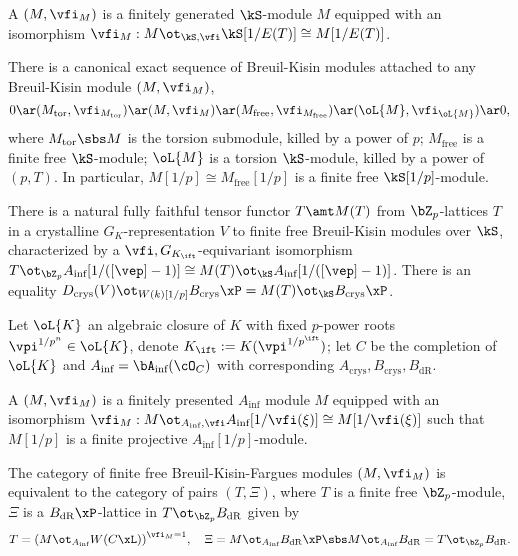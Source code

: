 \documentclass[article, a4paper, twoside]{universal}
\begin{document}
\begin{dfn}
	A  $(M,\vfi_{M})$ is a finitely generated $\kS$-module $M$ equipped with an isomorphism $\vfi_{M}:M\ot_{\kS,\vfi}\kS[1/E(T)]\cong M[1/E(T)]$.

\end{dfn}

\begin{thm}
	There is a canonical exact sequence of Breuil-Kisin modules attached to any Breuil-Kisin module $(M,\vfi_{M})$,
	\[
		0\ar(M_{\text{tor}},\vfi_{M_{\text{tor}}})\ar(M,\vfi_{M})\ar(M_{\text{free}},\vfi_{M_{\text{free}}})\ar(\oL{M},\vfi_{\oL{M}})\ar0,
	\]
	where $M_{\text{tor}}\sbs M$ is the torsion submodule, killed by a power of $p$; $M_{\text{free}}$ is a finite free $\kS$-module; $\oL{M}$ is a torsion $\kS$-module, killed by a power of $(p,T)$. In particular, $M[1/p]\cong M_{\text{free}}[1/p]$ is a finite free $\kS[1/p]$-module.
\end{thm}

\begin{thm}
	There is a natural fully faithful tensor functor $T\amt M(T)$ from $\bZ_{p}$-lattices $T$ in a crystalline $G_{K}$-representation $V$ to finite free Breuil-Kisin modules over $\kS$, characterized by a $\vfi,G_{K_{\ift}}$-equivariant isomorphism $T\ot_{\bZ_{p}}A_{\text{inf}}[1/([\vep]-1)]\cong M(T)\ot_{\kS}A_{\text{inf}}[1/([\vep]-1)]$. There is an equality $D_{\text{crys}}(V)\ot_{W(k)[1/p]}B_{\text{crys}}\xP= M(T)\ot_{\kS}B_{\text{crys}}\xP$.
\end{thm}

\begin{stp}
	Let $\oL{K}$ an algebraic closure of $K$ with fixed $p$-power roots $\vpi^{1/p^{n}}\in\oL{K}$, denote $K_{\ift}:=K(\vpi^{1/p^{\ift}})$; let $C$ be the completion of $\oL{K}$ and $A_{\text{inf}}=\bA_{\text{inf}}(\cO_{C})$ with corresponding $A_{\text{crys}},B_{\text{crys}},B_{\text{dR}}$.
\end{stp}

\begin{dfn}
	A  $(M,\vfi_{M})$ is a finitely presented $A_{\text{inf}}$ module $M$ equipped with an isomorphism $\vfi_{M}:M\ot_{A_{\text{inf}},\vfi}A_{\text{inf}}[1/\vfi(\xi)]\cong M[1/\vfi(\xi)]$ such that $M[1/p]$ is a finite projective $A_{\text{inf}}[1/p]$-module.
\end{dfn}

\begin{thm}
	The category of finite free Breuil-Kisin-Fargues modules $(M,\vfi_{M})$ is equivalent to the category of pairs $(T,\Xi)$, where $T$ is a finite free $\bZ_{p}$-module, $\Xi$ is a $B_{\text{dR}}\xP$-lattice in $T\ot_{\bZ_{p}}B_{\text{dR}}$ given by
	\[
		T={(M\ot_{A_{\text{inf}}}W(C\xL))}^{\vfi_{M}=1},\quad \Xi=M\ot_{A_{\text{inf}}}B_{\text{dR}}\xP\sbs M\ot_{A_{\text{inf}}}B_{\text{dR}}=T\ot_{\bZ_{p}}B_{\text{dR}}.
	\]
\end{thm}
\end{document}

